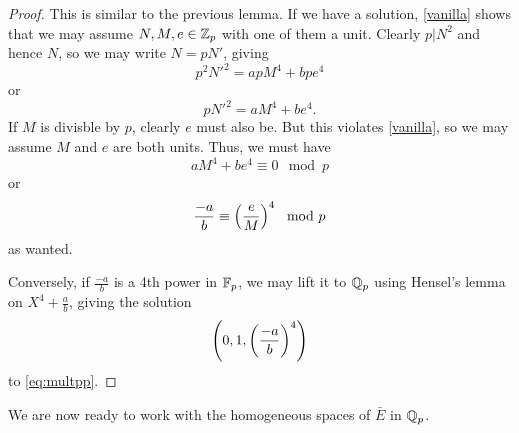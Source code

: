 \documentclass[12pt, a4paper]{amsart}
\begin{document}
\begin{proof}
  This is similar to the previous lemma. If we have a solution,
  \autoref{vanilla} shows that we may assume $N, M, e \in {\mathbb Z}_p$ with one
  of them a unit. Clearly $p | N^2$ and hence $N$, so we may write $N = pN'$,
  giving
  \[p^2N'^2 = apM^4 + bpe^4\]
  or
  \[pN'^2 = aM^4 + be^4.\]
  If $M$ is divisble by $p$, clearly $e$ must also be. But this violates
  \autoref{vanilla}, so we may assume $M$ and $e$ are both units.
  Thus, we must have
  \[aM^4 + be^4 \equiv 0 \mod{p}\]
  or
  \[\frac{-a}{b} \equiv \left(\frac{e}{M}\right)^4 \mod{p}\]
  as wanted.

  Conversely, if $\frac{-a}{b}$ is a 4th power in $\mathbb{F}_p$, we may lift it to
  ${\mathbb Q}_p$ using
  Hensel's lemma on $X^4 + \frac{a}{b}$, giving the solution
  \[\left(0, 1, \left(\frac{-a}{b}\right)^4\right)\]
  to \autoref{eq:multpp}.
\end{proof}

We are now ready to work with the homogeneous spaces of $\bar{E}$ in ${\mathbb Q}_p$.
\end{document}
